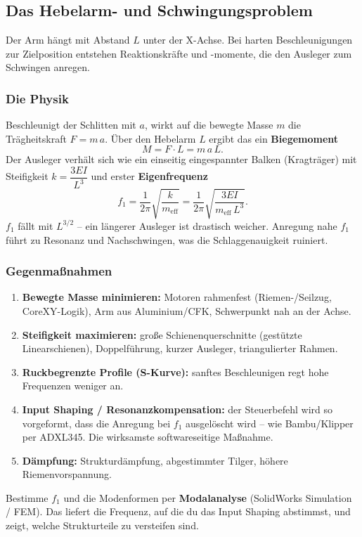 \subsection{Das Hebelarm- und Schwingungsproblem}
Der Arm hängt mit Abstand $L$ unter der X-Achse. Bei harten Beschleunigungen
zur Zielposition entstehen Reaktionskräfte und -momente, die den Ausleger zum
Schwingen anregen.

\subsubsection{Die Physik}
Beschleunigt der Schlitten mit $a$, wirkt auf die bewegte Masse $m$ die
Trägheitskraft $F=m\,a$. Über den Hebelarm $L$ ergibt das ein \textbf{Biegemoment}
\begin{equation}
M = F\cdot L = m\,a\,L.
\end{equation}
Der Ausleger verhält sich wie ein einseitig eingespannter Balken (Kragträger)
mit Steifigkeit $k=\dfrac{3EI}{L^3}$ und erster \textbf{Eigenfrequenz}
\begin{equation}
f_1 = \frac{1}{2\pi}\sqrt{\frac{k}{m_{\text{eff}}}}
    = \frac{1}{2\pi}\sqrt{\frac{3EI}{m_{\text{eff}}\,L^3}}.
\end{equation}
$f_1$ fällt mit $L^{3/2}$ -- ein längerer Ausleger ist drastisch weicher.
Anregung nahe $f_1$ führt zu Resonanz und Nachschwingen, was die
Schlaggenauigkeit ruiniert.

\subsubsection{Gegenmaßnahmen}
\begin{enumerate}
\item \textbf{Bewegte Masse minimieren:} Motoren rahmenfest (Riemen-/Seilzug,
  CoreXY-Logik), Arm aus Aluminium/CFK, Schwerpunkt nah an der Achse.
\item \textbf{Steifigkeit maximieren:} große Schienenquerschnitte (gestützte
  Linearschienen), Doppelführung, kurzer Ausleger, triangulierter Rahmen.
\item \textbf{Ruckbegrenzte Profile (S-Kurve):} sanftes Beschleunigen regt hohe
  Frequenzen weniger an.
\item \textbf{Input Shaping / Resonanzkompensation:} der Steuerbefehl wird so
  vorgeformt, dass die Anregung bei $f_1$ ausgelöscht wird -- wie Bambu/Klipper
  per ADXL345. Die wirksamste softwareseitige Maßnahme.
\item \textbf{Dämpfung:} Strukturdämpfung, abgestimmter Tilger, höhere
  Riemenvorspannung.
\end{enumerate}
\begin{infobox}[title=Anknüpfung an den FEM-Hintergrund]
Bestimme $f_1$ und die Modenformen per \textbf{Modalanalyse} (SolidWorks
Simulation / FEM). Das liefert die Frequenz, auf die du das Input Shaping
abstimmst, und zeigt, welche Strukturteile zu versteifen sind.
\end{infobox}

